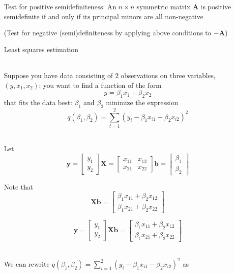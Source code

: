 \documentclass[10pt]{seminar}
\begin{document}
\begin{slide}
\vspace{.1in}

Test for positive semidefiniteness: An $n\times n$ symmetric matrix $\mathbf{A}$ is positive semidefinite if and only if its  principal minors are all non-negative

  \vspace{.1in}
  
  (Test for negative (semi)definiteness by applying above conditions to $-\mathbf{A} $)
  
  \newslide
  
  Least squares estimation
  
  \ \\Suppose you have data consisting of $2$ observations on three variables, $(y, x_1, x_2)$; you want to find a function of the form $$y=\beta_1x_1+\beta_2x_2$$ that fits the data best: $\beta_1$ and $\beta_2$ minimize the expression $$q(\beta_1, \beta_2)=\sum_{i=1}^2 (y_i-\beta_1x_{i1}-\beta_2x_{i2})^2$$
  
\ \\  Let $$\mathbf{y}=
\begin{bmatrix}y_1\\y_2
\end{bmatrix}
\mathbf{X}=
\begin{bmatrix}x_{11}& x_{12}\\x_{21}& x_{22}
\end{bmatrix}
\mathbf{b}=
\begin{bmatrix}\beta_1\\ \beta_2
\end{bmatrix}
$$

Note that $$\mathbf{Xb}=\begin{bmatrix}\beta_1x_{11}+\beta_2 x_{12}\\\beta_1x_{21}+\beta_2 x_{22}
\end{bmatrix}$$
  
  
  \newslide
  
  $$\mathbf{y}=
\begin{bmatrix}y_1\\y_2
\end{bmatrix}  \mathbf{Xb}=\begin{bmatrix}\beta_1x_{11}+\beta_2 x_{12}\\\beta_1x_{21}+\beta_2 x_{22}
\end{bmatrix}$$
  
  
\ \\We can rewrite $q(\beta_1, \beta_2)=\sum_{i=1}^2 (y_i-\beta_1x_{i1}-\beta_2x_{i2})^2$ as 
  

\end{slide}
\end{document}
